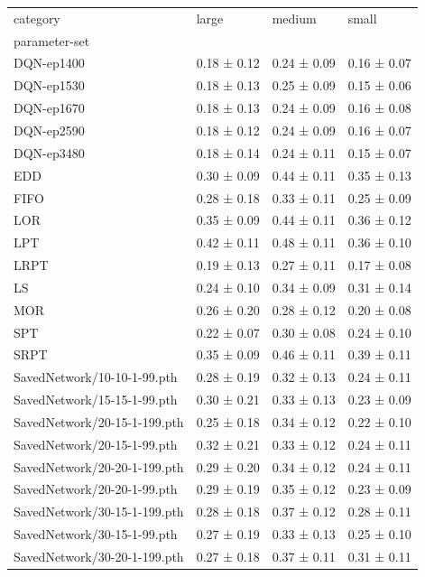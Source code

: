     
\begin{tabular}{llll}
    \toprule
    category & large & medium & small \\
    parameter-set &  &  &  \\
    \midrule
    DQN-ep1400 & 0.18 ± 0.12 & 0.24 ± 0.09 & 0.16 ± 0.07 \\
    DQN-ep1530 & 0.18 ± 0.13 & 0.25 ± 0.09 & 0.15 ± 0.06 \\
    DQN-ep1670 & 0.18 ± 0.13 & 0.24 ± 0.09 & 0.16 ± 0.08 \\
    DQN-ep2590 & 0.18 ± 0.12 & 0.24 ± 0.09 & 0.16 ± 0.07 \\
    DQN-ep3480 & 0.18 ± 0.14 & 0.24 ± 0.11 & 0.15 ± 0.07 \\
    EDD & 0.30 ± 0.09 & 0.44 ± 0.11 & 0.35 ± 0.13 \\
    FIFO & 0.28 ± 0.18 & 0.33 ± 0.11 & 0.25 ± 0.09 \\
    LOR & 0.35 ± 0.09 & 0.44 ± 0.11 & 0.36 ± 0.12 \\
    LPT & 0.42 ± 0.11 & 0.48 ± 0.11 & 0.36 ± 0.10 \\
    LRPT & 0.19 ± 0.13 & 0.27 ± 0.11 & 0.17 ± 0.08 \\
    LS & 0.24 ± 0.10 & 0.34 ± 0.09 & 0.31 ± 0.14 \\
    MOR & 0.26 ± 0.20 & 0.28 ± 0.12 & 0.20 ± 0.08 \\
    SPT & 0.22 ± 0.07 & 0.30 ± 0.08 & 0.24 ± 0.10 \\
    SRPT & 0.35 ± 0.09 & 0.46 ± 0.11 & 0.39 ± 0.11 \\
    SavedNetwork/10-10-1-99.pth & 0.28 ± 0.19 & 0.32 ± 0.13 & 0.24 ± 0.11 \\
    SavedNetwork/15-15-1-99.pth & 0.30 ± 0.21 & 0.33 ± 0.13 & 0.23 ± 0.09 \\
    SavedNetwork/20-15-1-199.pth & 0.25 ± 0.18 & 0.34 ± 0.12 & 0.22 ± 0.10 \\
    SavedNetwork/20-15-1-99.pth & 0.32 ± 0.21 & 0.33 ± 0.12 & 0.24 ± 0.11 \\
    SavedNetwork/20-20-1-199.pth & 0.29 ± 0.20 & 0.34 ± 0.12 & 0.24 ± 0.11 \\
    SavedNetwork/20-20-1-99.pth & 0.29 ± 0.19 & 0.35 ± 0.12 & 0.23 ± 0.09 \\
    SavedNetwork/30-15-1-199.pth & 0.28 ± 0.18 & 0.37 ± 0.12 & 0.28 ± 0.11 \\
    SavedNetwork/30-15-1-99.pth & 0.27 ± 0.19 & 0.33 ± 0.13 & 0.25 ± 0.10 \\
    SavedNetwork/30-20-1-199.pth & 0.27 ± 0.18 & 0.37 ± 0.11 & 0.31 ± 0.11 \\

\end{tabular}
